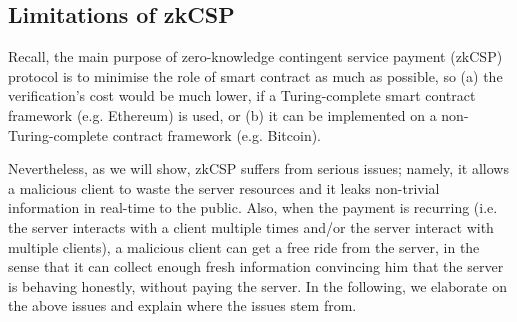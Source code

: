 
\subsection{Limitations of zkCSP}

Recall,  the main purpose of zero-knowledge contingent service payment (zkCSP) protocol \cite{CampanelliGGN17}  is to minimise the role of smart contract as much as possible, so  (a) the verification's cost would be much lower, if a Turing-complete smart contract framework (e.g. Ethereum) is used, or (b) it can be implemented on  a non-Turing-complete contract framework (e.g. Bitcoin).   


Nevertheless, as we will show,  zkCSP suffers from  serious issues; namely, it allows a malicious client to waste the server resources and  it leaks non-trivial information in real-time to the public. Also, when the payment is recurring (i.e. the server interacts with a client multiple times and/or the server interact with multiple clients), a malicious client can get a free ride from the server, in the sense that it can collect enough fresh information convincing him that the server is behaving honestly, without paying the server. In the following, we elaborate on the  above issues and explain where the issues stem from.

